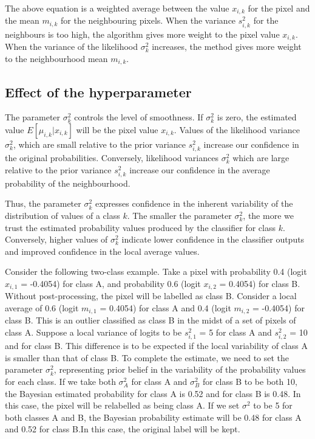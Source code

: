 \documentclass[
  shortnames]{jss}
\begin{document}
The above equation is a weighted average between the value \(x_{i,k}\) for the pixel
and the mean \(m_{i,k}\) for the neighbouring pixels. When the variance \(s^2_{i,k}\) for the
neighbours is too high, the algorithm gives more weight to the pixel value \(x_{i,k}\).
When the variance of the likelihood \(\sigma^2_k\) increases, the method gives more weight to the neighbourhood mean \(m_{i,k}\).

\newpage

\hypertarget{effect-of-the-hyperparameter}{%
\subsection{Effect of the hyperparameter}\label{effect-of-the-hyperparameter}}

The parameter \(\sigma^2_k\) controls the level of smoothness. If \(\sigma^2_k\) is zero,
the estimated value \({E}[\mu_{i,k} | x_{i,k}]\) will be the pixel value \(x_{i,k}\).
Values of the likelihood variance \(\sigma^2_{k}\), which are small relative to the prior variance \(s^2_{i,k}\) increase our confidence in the original probabilities. Conversely, likelihood variances \(\sigma^2_{k}\) which are large relative to the prior variance \(s^2_{i,k}\) increase our confidence in the average probability of the neighbourhood.

Thus, the parameter \(\sigma^2_{k}\) expresses confidence in the inherent variability
of the distribution of values of a class \(k\). The smaller the parameter \(\sigma^2_{k}\),
the more we trust the estimated probability values produced by the classifier for class \(k\).
Conversely, higher values of \(\sigma^2_{k}\) indicate lower confidence in the classifier
outputs and improved confidence in the local average values.

Consider the following two-class example. Take a pixel with probability 0.4
(logit \(x_{i,1}\) = -0.4054) for class A, and probability 0.6 (logit \(x_{i,2}\) = 0.4054)
for class B. Without post-processing, the pixel will be labelled as class B. Consider a
local average of 0.6 (logit \(m_{i,1}\) = 0.4054) for class A and 0.4
(logit \(m_{i,2}\) = -0.4054) for class B. This is an outlier classified as class B in the midst of a set of pixels of class A. Suppose a local variance of logits to be \(s^2_{i,1}\) = 5 for class A and \(s^2_{i,2}\) = 10 and for class B. This difference is to be expected if the local variability of class A is smaller than that of class B. To complete the estimate, we need to set the parameter \(\sigma^2_{k}\), representing prior belief in the variability of the probability values for each class. If we take both \(\sigma^2_{A}\) for class A and \(\sigma^2_{B}\) for class B to be both 10, the Bayesian estimated probability for class A is 0.52 and for class B is 0.48. In this case, the pixel will be relabelled as being class A. If we set \(\sigma^2\) to be 5 for both classes A and B, the Bayesian probability estimate will be 0.48 for class A and 0.52 for class B.In this case, the original label will be kept.
\end{document}
